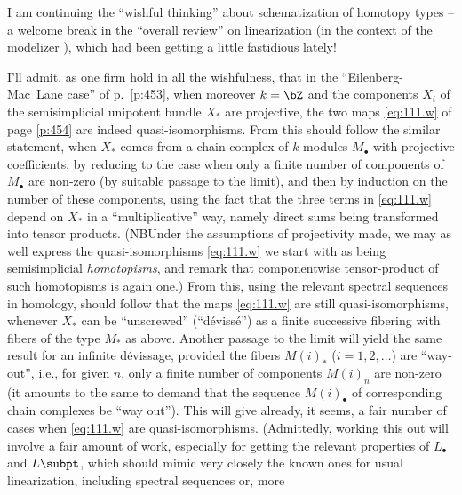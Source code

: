 \bigbreak

\presectionfill{}\par

\label{sec:112}%
I am continuing the ``wishful thinking'' about schematization of
homotopy types -- a welcome break in the ``overall review'' on
linearization (in the context of the modelizer \Cat), which had been
getting a little fastidious lately!

I'll admit, as one firm hold in all the wishfulness, that in the
``Eilenberg-Mac~Lane case'' of p.~\ref{p:453}, when moreover $k=\bZ$
and the components $X_i$ of the semisimplicial unipotent bundle $X_*$
are projective, the two maps \eqref{eq:111.w} of page \ref{p:454} are
indeed quasi-isomorphisms. From this should follow the similar
statement, when $X_*$ comes from a chain complex of $k$-modules
$M_\bullet$ with projective coefficients, by reducing to the case when
only a finite number of components of $M_\bullet$ are non-zero (by
suitable passage to the limit), and then by induction on the number of
these components, using the fact that the three terms in
\eqref{eq:111.w} depend on $X_*$ in a ``multiplicative'' way, namely
direct sums being transformed into tensor products. (NB\enspace Under
the assumptions of projectivity made, we may as well express the
quasi-isomorphisms \eqref{eq:111.w} we start with as being
semisimplicial \emph{homotopisms}, and remark that componentwise
tensor-product of such homotopisms is again one.) From this, using the
relevant spectral sequences in homology, should follow that the maps
\eqref{eq:111.w} are still quasi-isomorphisms, whenever $X_*$ can be
``unscrewed'' (``dévissé'') as a finite successive fibering with
fibers of the type $M_*$ as above. Another passage to the limit will
yield the same result for an infinite dévissage, provided the fibers
$M(i)_*$ ($i=1,2,\ldots$) are ``way-out'', i.e., for given $n$, only a
finite number of components $M(i)_n$ are non-zero (it amounts to the
same to demand that the sequence $M(i)_\bullet$ of corresponding chain
complexes be ``way out''). This will give already, it seems, a fair
number of cases when \eqref{eq:111.w} are
quasi-isomorphisms. (Admittedly, working this out will involve a fair
amount of work, especially for getting the relevant properties of
$L_\bullet$ and $L\subpt$, which should mimic very closely the known
ones for usual linearization, including spectral sequences or, more
